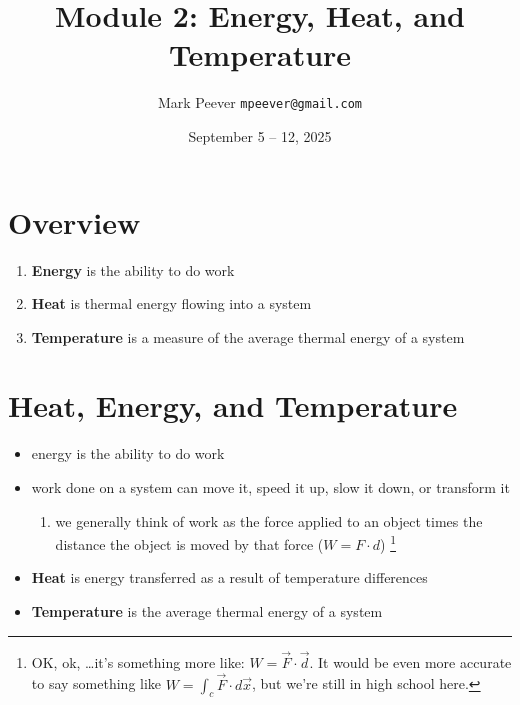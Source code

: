 \documentclass[11pt, oneside]{article}   	%
\title{Module 2: Energy, Heat, and Temperature }
\author{Mark Peever \texttt{mpeever@gmail.com}}
\date{September 5 -- 12, 2025}
\begin{document}
\maketitle

\section{Overview}
\begin{enumerate}
\item \textbf{Energy} is the ability to do work
\item \textbf{Heat} is thermal energy flowing into a system
\item \textbf{Temperature} is a measure of the average thermal energy of a system
\end{enumerate}

\section{Heat, Energy, and Temperature}
\begin{itemize}
\item energy is the ability to do work
\item work done on a system can move it, speed it up, slow it down, or transform it
\begin{enumerate}
\item we generally think of work as the force applied to an object times the distance the object is moved by that force ($W = F \cdot d$)
\footnote{OK, ok, \ldots it's something more like: $W = \vec{F} \cdot \vec{d}$. It would be even more accurate to say something like  $W = \int_{c} \vec{F} \cdot d\vec{x}$, but we're still in high school here.}
\end{enumerate}
\item \textbf{Heat} is energy transferred as a result of temperature differences
\item \textbf{Temperature} is the average thermal energy of a system
\end{itemize}
\end{document}
